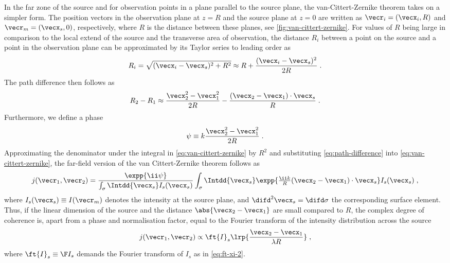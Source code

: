 \documentclass[
twoside,
openright,
titlepage,
numbers=noenddot,
headinclude,
fleqn,
a4paper,
footinclude=true,
cleardoublepage=empty,
abstractoff,
BCOR=5mm,
paper=a4,
fontsize=11pt,
british,ngerman,american,
]{scrreprt}
\begin{document}
In the far zone of the source and for observation points in a plane
parallel to the source plane, the van-Cittert-Zernike theorem takes on
a simpler form.  The position vectors in the observation plane at
$z=R$ and the source plane at $z=0$ are written as
$\vecr_i=(\vecx_i,R)$ and $\vecr_m=(\vecx_s,0)$, respectively, where
$R$ is the distance between these planes, see
\cref{fig:van-cittert-zernike}.  For values of $R$ being large in
comparison to the local extend of the source and the transverse area
of observation, the distance $R_i$ between a point on the source and a
point in the observation plane can be approximated by its Taylor
series to leading order as
\begin{equation}
  \label{eq:r-approximation}
  R_i = \sqrt{(\vecx_i-\vecx_s)^2 + R^2} 
  \approx R + \frac{(\vecx_i-\vecx_s)^2}{2 R} \;.
\end{equation}
The path difference then follows as
\begin{equation}
  \label{eq:path-difference}
  R_2 - R_1 \approx \frac{\vecx_2^2-\vecx_1^2}{2R} 
  - \frac{(\vecx_2-\vecx_1)\cdot\vecx_s}{R} \;.
\end{equation}
Furthermore, we define a phase
\begin{equation}
  \label{eq:phase-factor}
  \psi \equiv k\frac{\vecx_2^2-\vecx_1^2}{2R} \;.
\end{equation}
Approximating the denominator under the integral in
\cref{eq:van-cittert-zernike} by $R^2$ and substituting
\cref{eq:path-difference} into \cref{eq:van-cittert-zernike}, the
far-field version of the van Cittert-Zernike theorem follows as
\begin{equation}
  \label{eq:van-cittert-zernike-far-field}
  j(\vecr_1,\vecr_2) = 
  \frac{\expp{\ii\psi}}{\int_\sigma \Intdd{\vecx_s}I_s(\vecx_s)} 
  \int_\sigma\Intdd{\vecx_s}
 \expp{\tfrac{\ii k}{R}(\vecx_2-\vecx_1) \cdot \vecx_s}I_s(\vecx_s) \;,
\end{equation}
where $I_s(\vecx_s)\equiv I(\vecr_m)$ denotes the intensity at the
source plane, and $\difd^2\vecx_s=\difd\sigma$ the corresponding
surface element.  Thus, if the linear dimension of the source and the
distance $\abs{\vecx_2-\vecx_1}$ are small compared to $R$, the
complex degree of coherence is, apart from a phase and normalisation
factor, equal to the Fourier transform of the intensity distribution
across the source
\begin{equation}
  \label{eq:van-cittert-zernike-far-field-prop}
  j(\vecr_1,\vecr_2) 
  \propto \ft{ I}_s\lrp{ \frac{\vecx_2-\vecx_1}{\lambda R} } \;,
\end{equation}
where $\ft{I}_s \equiv \F I_s$ demands the Fourier transform of $I_s$
as in \cref{eq:ft-xi-2}.
\end{document}
